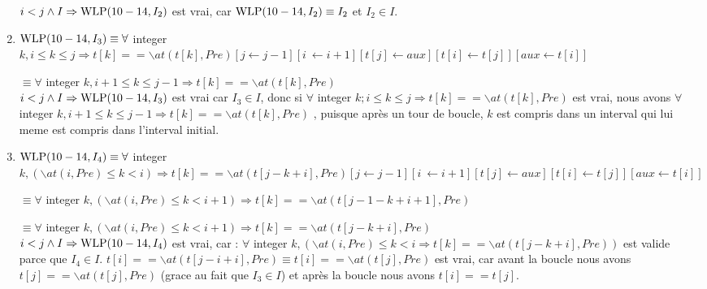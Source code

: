 \documentclass[11pt,answers]{exam}
\begin{document}
\begin{questions}
\begin{parts}
\begin{solutionorbox}
\begin{enumerate}
                    $i < j \land I \Rightarrow \mathrm{WLP}(10-14,I_2)$ est vrai, car $\mathrm{WLP}(10-14,I_2) \equiv I_2$ et $I_2 \in I$.
                
                \item $\mathrm{WLP}(10-14,I_3) \equiv \forall$ integer $k, i \leq k \leq j \Rightarrow t[k] == \backslash at(t[k], Pre)[j \leftarrow j - 1][i \ \leftarrow i + 1][t[j] \leftarrow aux][t[i] \leftarrow t[j]][aux \leftarrow t[i]]$
                    
                \hspace*{2.9cm}$\equiv \forall$ integer $k, i + 1 \leq k \leq j-1 \Rightarrow t[k] == \backslash at(t[k], Pre)$ \\
    
                    $i < j \land I \Rightarrow \mathrm{WLP}(10-14,I_3)$ est vrai car $I_3 \in I$, donc si $\forall$ integer $k ; i \leq k \leq j \Rightarrow t[k] == \backslash at(t[k], Pre)$ est vrai, nous avons $\forall$ integer $k, i+1 \leq k \leq j-1 \Rightarrow t[k] == \backslash at(t[k], Pre)$ , puisque après un tour de boucle, $k$ est compris dans un interval qui lui meme est compris dans l'interval initial.
    
                \item  $\mathrm{WLP}(10-14,I_4) \equiv \forall$ integer $k, (\backslash at(i, Pre) \leq k<i) \Rightarrow t[k] == \backslash at(t[j- k + i], Pre)[j \leftarrow j-1][i \ \leftarrow i + 1][t[j] \leftarrow aux][t[i] \leftarrow t[j]][aux \leftarrow t[i]]$
    
                \hspace*{3.1cm}$\equiv \forall$ integer $k, (\backslash at(i, Pre) \leq k < i + 1) \Rightarrow t[k] == \backslash at(t[j-1- k + i+1], Pre)$
    
                \hspace*{3.1cm}$\equiv \forall$ integer $k, (\backslash at(i, Pre) \leq k < i + 1) \Rightarrow t[k] == \backslash at(t[j- k + i], Pre)$\\
    
                    $i < j \land I \Rightarrow \mathrm{WLP}(10-14,I_4)$ est vrai, car : $ \forall$ integer $k, (\backslash at(i, Pre) \leq k<i \Rightarrow t[k] == \backslash at(t[j- k + i], Pre))$ est valide parce que $I_4 \in I$.
                    $t[i] == \backslash at(t[j- i + i], Pre) \equiv t[i] == \backslash at(t[j], Pre)$ est vrai, car avant la boucle nous avons $t[j] == \backslash at(t[j], Pre)$ (grace au fait que $I_3 \in I$) et  après la boucle nous avons $t[i] == t[j]$.
    

\end{enumerate}
\end{solutionorbox}
\end{parts}
\end{questions}
\end{document}
